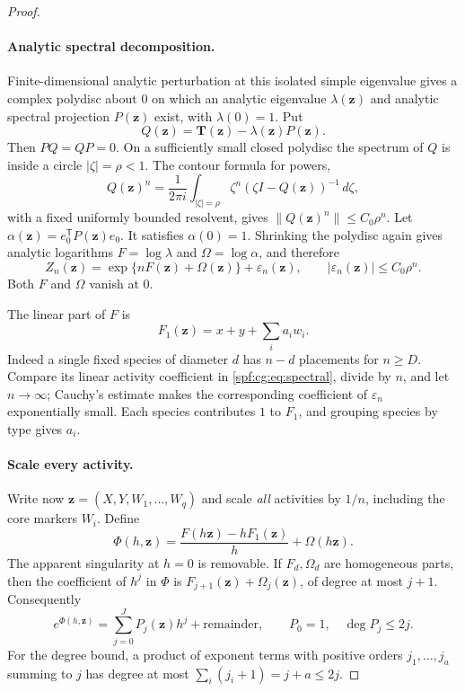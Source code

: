 \documentclass[11pt]{article}
\numberwithin{equation}{section}
\theoremstyle{definition}
\theoremstyle{remark}
\theoremstyle{definition}
\begin{document}
\begin{proof}
\paragraph{Analytic spectral decomposition.}
Finite-dimensional analytic perturbation at this isolated simple eigenvalue
gives a complex polydisc about $0$ on which an analytic eigenvalue
$\lambda(\boldsymbol z)$ and analytic spectral projection $P(\boldsymbol z)$
exist, with $\lambda(0)=1$. Put
\[
 Q(\boldsymbol z)=\mathbf T(\boldsymbol z)-\lambda(\boldsymbol z)P(\boldsymbol z).
\]
Then $PQ=QP=0$. On a sufficiently small closed polydisc the spectrum of
$Q$ is inside a circle $|\zeta|=\rho<1$. The contour formula for powers,
\[
 Q(\boldsymbol z)^n=\frac1{2\pi i}\int_{|\zeta|=\rho}
 \zeta^n(\zeta I-Q(\boldsymbol z))^{-1}\,d\zeta,
\]
with a fixed uniformly bounded resolvent, gives
$\|Q(\boldsymbol z)^n\|\le C_0\rho^n$. Let
$\alpha(\boldsymbol z)=e_0^{\mathsf T}P(\boldsymbol z)e_0$. It satisfies
$\alpha(0)=1$. Shrinking the polydisc again gives analytic logarithms
$F=\log\lambda$ and $\Omega=\log\alpha$, and therefore
\begin{equation}
 Z_n(\boldsymbol z)=\exp\{nF(\boldsymbol z)+\Omega(\boldsymbol z)\}+\varepsilon_n(\boldsymbol z),\qquad
 |\varepsilon_n(\boldsymbol z)|\le C_0\rho^n.
 \label{spf:cg:eq:spectral}
\end{equation}
Both $F$ and $\Omega$ vanish at $0$.

The linear part of $F$ is
\begin{equation}
 F_1(\boldsymbol z)=x+y+\sum_ia_iw_i.
 \label{spf:cg:eq:linearF}
\end{equation}
Indeed a single fixed species of diameter $d$ has $n-d$ placements for
$n\ge D$. Compare its linear activity coefficient in
\eqref{spf:cg:eq:spectral}, divide by $n$, and let $n\to\infty$; Cauchy's
estimate makes the corresponding coefficient of $\varepsilon_n$
exponentially small. Each species contributes $1$ to $F_1$, and grouping
species by type gives $a_i$.

\paragraph{Scale every activity.}
Write now $\boldsymbol z=(X,Y,W_1,\ldots,W_q)$ and scale \emph{all}
activities by $1/n$, including the core markers $W_i$. Define
\begin{equation}
 \Phi(h,\boldsymbol z)=\frac{F(h\boldsymbol z)-hF_1(\boldsymbol z)}h+\Omega(h\boldsymbol z).
 \label{spf:cg:eq:Phi}
\end{equation}
The apparent singularity at $h=0$ is removable. If $F_d,\Omega_d$ are
homogeneous parts, then the coefficient of $h^j$ in $\Phi$ is
$F_{j+1}(\boldsymbol z)+\Omega_j(\boldsymbol z)$, of degree at most $j+1$.
Consequently
\begin{equation}
 e^{\Phi(h,\boldsymbol z)}=\sum_{j=0}^{J}P_j(\boldsymbol z)h^j+\text{remainder},
 \qquad P_0=1,\quad\deg P_j\le2j.
 \label{spf:cg:eq:Pj}
\end{equation}
For the degree bound, a product of exponent terms with positive orders
$j_1,\ldots,j_a$ summing to $j$ has degree at most
$\sum_i(j_i+1)=j+a\le2j$.


\end{proof}
\end{document}
